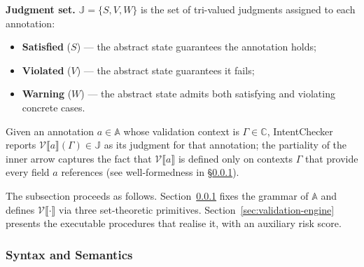 \documentclass[pdflatex,sn-basic]{sn-jnl}%
\theoremstyle{thmstyleone}%
\theoremstyle{thmstyletwo}%
\theoremstyle{thmstylethree}%
\begin{document}
\smallskip
\noindent\textbf{Judgment set.}
$\mathbb{J} = \{S, V, W\}$ is the set of tri-valued judgments assigned to each annotation:
\begin{itemize}
    \item \textbf{Satisfied} ($S$) --- the abstract state guarantees the annotation holds;
    \item \textbf{Violated} ($V$) --- the abstract state guarantees it fails;
    \item \textbf{Warning} ($W$) --- the abstract state admits both satisfying and violating concrete cases.
\end{itemize}
Given an annotation $a \in \mathbb{A}$ whose validation context is $\Gamma \in \mathbb{C}$, IntentChecker reports $\mathcal{V}\llbracket a \rrbracket(\Gamma) \in \mathbb{J}$ as its judgment for that annotation; the partiality of the inner arrow captures the fact that $\mathcal{V}\llbracket a \rrbracket$ is defined only on contexts $\Gamma$ that provide every field $a$ references (see well-formedness in §\ref{sec:intent-semantics}).

The subsection proceeds as follows.
Section~\ref{sec:intent-semantics} fixes the grammar of $\mathbb{A}$ and defines $\mathcal{V}\llbracket \cdot \rrbracket$ via three set-theoretic primitives.
Section~\ref{sec:validation-engine} presents the executable procedures that realise it, with an auxiliary risk score.

\subsubsection{Syntax and Semantics}\label{sec:intent-semantics}
\end{document}
